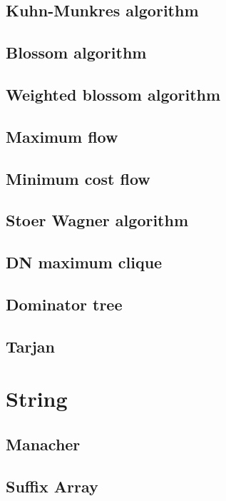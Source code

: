 \documentclass[titlepage, a4paper,10pt]{article}
\begin{document}
\begin{multicols}{2}
\begin{spacing}{0.6}
{			\subsection{Kuhn-Munkres algorithm}
				
			\subsection{Blossom algorithm}
				
			\subsection{Weighted blossom algorithm}
				
			\subsection{Maximum flow}
				
			\subsection{Minimum cost flow}
				
			\subsection{Stoer Wagner algorithm}
				
			\subsection{DN maximum clique}
				
			\subsection{Dominator tree}
				
			\subsection{Tarjan}
				
		\section{String}
			\subsection{Manacher}
				
			\subsection{Suffix Array}
				
}
\end{spacing}
\end{multicols}
\end{document}
